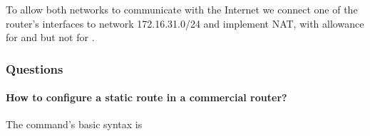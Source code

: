 \documentclass[compilation.tex]{subfiles}
\begin{document}
	To allow both networks to communicate with the Internet we connect one of the router's interfaces to network 172.16.31.0/24 and implement NAT, with allowance for  and  but not for .
	
	\subsubsection{Questions}
	\label{subsubsec:exp4questions}
	
	\paragraph{How to configure a static route in a commercial router?}
	The command's basic syntax is
	\begin{center}
	\end{center}
	
\end{document}
